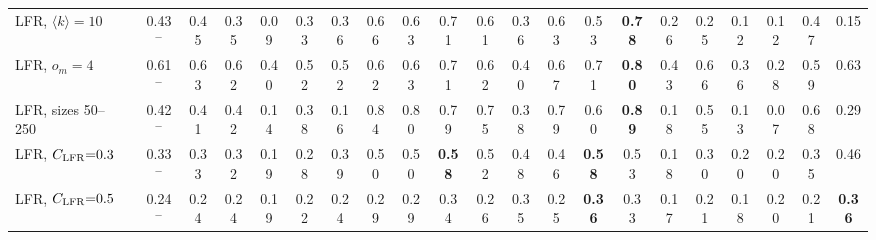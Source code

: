 \begin{table}[p]
{\begin{tabular}{llcccc|cc|cccccc|cccccccc}
LFR, $\langle k\rangle{=}10$ &  & 0.43$^{-}$ & 0.45 & 0.35 & 0.09 & 0.33 & 0.36 & 0.66 & 0.63 & 0.71 & 0.61 & 0.36 & 0.63 & 0.53 & \textbf{0.78} & 0.26 & 0.25 & 0.12 & 0.12 & 0.47 & 0.15 \\
LFR, $o_m{=}4$ &  & 0.61$^{-}$ & 0.63 & 0.62 & 0.40 & 0.52 & 0.52 & 0.62 & 0.63 & 0.71 & 0.62 & 0.40 & 0.67 & 0.71 & \textbf{0.80} & 0.43 & 0.66 & 0.36 & 0.28 & 0.59 & 0.63 \\
LFR, sizes 50--250 &  & 0.42$^{-}$ & 0.41 & 0.42 & 0.14 & 0.38 & 0.16 & 0.84 & 0.80 & 0.79 & 0.75 & 0.38 & 0.79 & 0.60 & \textbf{0.89} & 0.18 & 0.55 & 0.13 & 0.07 & 0.68 & 0.29 \\
LFR, $C_{\rm LFR}{=}0.3$ &  & 0.33$^{-}$ & 0.33 & 0.32 & 0.19 & 0.28 & 0.39 & 0.50 & 0.50 & \textbf{0.58} & 0.52 & 0.48 & 0.46 & \textbf{0.58} & 0.53 & 0.18 & 0.30 & 0.20 & 0.20 & 0.35 & 0.46 \\
LFR, $C_{\rm LFR}{=}0.5$ &  & 0.24$^{-}$ & 0.24 & 0.24 & 0.19 & 0.22 & 0.24 & 0.29 & 0.29 & 0.34 & 0.26 & 0.35 & 0.25 & \textbf{0.36} & 0.33 & 0.17 & 0.21 & 0.18 & 0.20 & 0.21 & \textbf{0.36} \\
\hline\hline
\end{tabular}}
\end{table}


